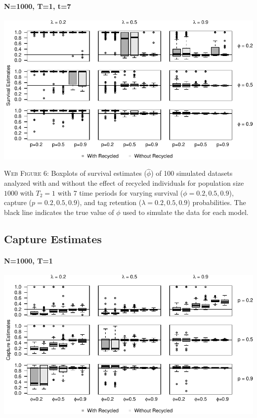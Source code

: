 \documentclass[]{article}
\let\oldparagraph\paragraph
\renewcommand{\paragraph}[1]{\oldparagraph{#1}\mbox{}}
\begin{document}
\paragraph{N=1000, T=1, t=7}\label{n1000-t1-t7}

\includegraphics{Appendix_BW_files/figure-latex/figure6_survival_GJSTL6-1.pdf}

\textsc{Web Figure 6:} Boxplots of survival estimates (\(\hat{\phi}\))
of 100 simulated datasets analyzed with and without the effect of
recycled individuals for population size \(1000\) with \(T_2=1\) with 7
time periods for varying survival (\(\phi=0.2,0.5,0.9\)), capture
(\(p=0.2,0.5,0.9\)), and tag retention (\(\lambda=0.2,0.5,0.9\))
probabilities. The black line indicates the true value of \(\phi\) used
to simulate the data for each model.

\newpage

\subsection{Capture Estimates}\label{capture-estimates}

\paragraph{N=1000, T=1}\label{n1000-t1-1}

\includegraphics{Appendix_BW_files/figure-latex/figure7_capture_GJSTL1-1.pdf}
\end{document}
